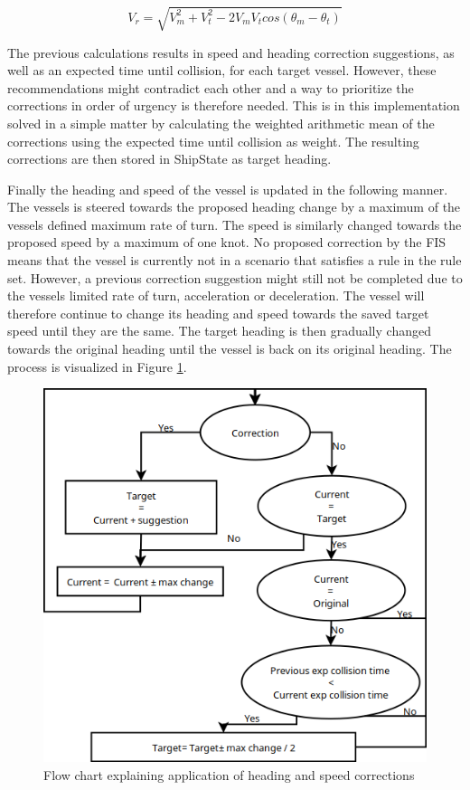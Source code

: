 \begin{equation}
    V_r=\sqrt{V_m^2 + V_t^2-2  V_mV_tcos(\theta_m-\theta_t)}
    \label{eq:rel_vel_calc}
\end{equation}

The previous calculations results in speed and heading correction suggestions, as well as an expected time until collision, for each target vessel. However, these recommendations might contradict each other and a way to prioritize the corrections in order of urgency is therefore needed. This is in this implementation solved in a simple matter by calculating the weighted arithmetic mean of the corrections using the expected time until collision as weight. The resulting corrections are then stored in ShipState as target heading.

Finally the heading and speed of the vessel is updated in the following manner. The vessels is steered towards the proposed heading change by a maximum of the vessels defined maximum rate of turn. The speed is similarly changed towards the proposed speed by a maximum of one knot. No proposed correction by the FIS means that the vessel is currently not in a scenario that satisfies a rule in the rule set. However, a previous correction suggestion might still not be completed due to the vessels limited rate of turn, acceleration or deceleration.  The vessel will therefore continue to change its heading and speed towards the saved target speed until they are the same.  The target heading is then gradually changed towards the original heading until the vessel is back on its original heading. The process is visualized in Figure \ref{fig:flow_chart}.
\begin{figure}[H]
    \centering
    \includegraphics[width=\textwidth,height=0.75\textheight,keepaspectratio]{Figures/flow.png}
    \caption{Flow chart explaining application of heading and speed corrections}
    \label{fig:flow_chart}
\end{figure}

